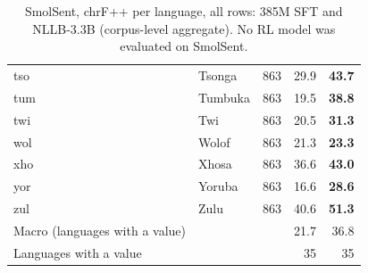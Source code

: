 \begin{table}[t]
\begin{tabular}{@{}llrrr@{}}
tso & Tsonga & 863 & 29.9 & \textbf{43.7} \\
tum & Tumbuka & 863 & 19.5 & \textbf{38.8} \\
twi & Twi & 863 & 20.5 & \textbf{31.3} \\
wol & Wolof & 863 & 21.3 & \textbf{23.3} \\
xho & Xhosa & 863 & 36.6 & \textbf{43.0} \\
yor & Yoruba & 863 & 16.6 & \textbf{28.6} \\
zul & Zulu & 863 & 40.6 & \textbf{51.3} \\
\midrule
Macro (languages with a value) & & & 21.7 & 36.8 \\
Languages with a value & & & 35 & 35 \\
\bottomrule
\end{tabular}
\caption{SmolSent, chrF++ per language, all rows: 385M SFT and NLLB-3.3B (corpus-level aggregate). No RL model was evaluated on SmolSent.}
\label{tab:full-smol-chrfpp}
\end{table}
